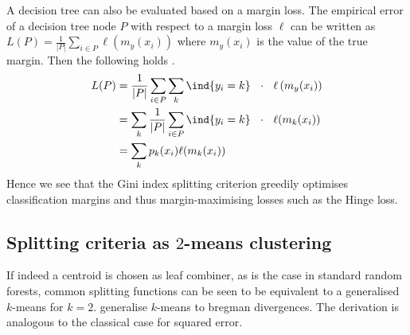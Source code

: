 \documentclass[../main.tex]{subfiles}
\begin{document}
%
A decision tree can also be evaluated based on a margin loss.
The empirical error of a decision tree node $P$ with respect to a margin loss $\ell$ can be written as $L(P) = \frac{1}{|P|} \sum_{i \in P} \ell\left(m_{y}(x_{i})\right)$ where $m_{y}(x_{i})$ is the value of the true margin. Then the following holds \cite{leistner_SemiSupervisedRandomForests_2009}.
\begin{align*}
L(P) &= \frac{1}{|P|}\sum_{i \in P} \sum_{k} \ind{y_{i}=k} ~ ~ \cdot ~ ~  \ell   \left( m_y(x_i) \right)  \\
&= \sum_{k}  
\frac{1}{|P|} \sum_{i \in P} \ind{y_{i}=k}
~ ~ \cdot ~ ~ 
\ell(m_{k}(x_{i})) \\
&= \sum_k p_k(x_i) \ell(m_k(x_i))
\end{align*}
Hence we see that the Gini index splitting criterion greedily optimises classification margins and thus margin-maximising losses such as the Hinge loss.


\subsection{Splitting criteria as $2$-means clustering}


If indeed a centroid is chosen as leaf combiner, as is the case in standard random forests, common splitting functions can be seen to be equivalent to a generalised $k$-means for $k=2$. \cite{banerjee} generalise $k$-means to bregman divergences. The derivation is analogous to the classical case for squared error. 

\end{document}
